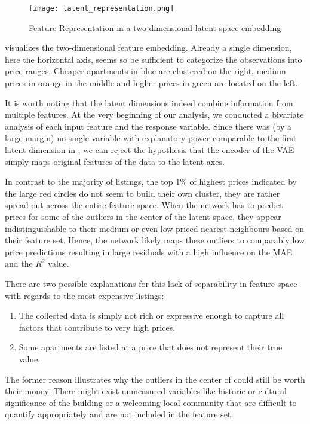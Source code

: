 \begin{figure}[t]
  \centering
  \texttt{[image: latent\_representation.png]}
  \caption{Feature Representation in a two-dimensional latent space embedding}
  \label{fig:latent-representation}
\end{figure}

 visualizes the two-dimensional feature embedding.
Already a single dimension, here the horizontal axis, seems so be sufficient to categorize the observations into price ranges.
Cheaper apartments in blue are clustered on the right, medium prices in orange in the middle and higher prices in green are located on the left.

It is worth noting that the latent dimensions indeed combine information from multiple features.
At the very beginning of our analysis, we conducted a bivariate analysis of each input feature and the response variable.
Since there was (by a large margin) no single variable with explanatory power comparable to the first latent dimension in , we can reject the hypothesis that the encoder of the VAE simply maps original features of the data to the latent axes.

In contrast to the majority of listings, the top $1$\% of highest prices indicated by the large red circles do not seem to build their own cluster, they are rather spread out across the entire feature space.
When the network has to predict prices for some of the outliers in the center of the latent space, they appear indistinguishable to their medium or even low-priced nearest neighbours based on their feature set.
Hence, the network likely maps these outliers to comparably low price predictions resulting in large residuals with a high influence on the MAE and the $R^2$ value.

There are two possible explanations for this lack of separability in feature space with regards to the most expensive listings:

\begin{enumerate}
  \item The collected data is simply not rich or expressive enough to capture all factors that contribute to very high prices.
  \item Some apartments are listed at a price that does not represent their true value.
\end{enumerate}


The former reason illustrates why the outliers in the center of  could still be worth their money:
There might exist unmeasured variables like historic or cultural significance of the building or a welcoming local community that are difficult to quantify appropriately and are not included in the feature set.

